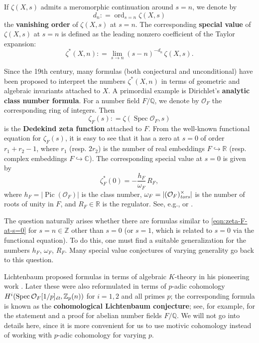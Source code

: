 \documentclass[draft]{article}
\DeclareMathOperator{\ord}{ord}
\DeclareMathOperator{\Pic}{Pic}
\DeclareMathOperator{\Spec}{Spec}
\newcommand{\CC}{\mathbb{C}}
\newcommand{\QQ}{\mathbb{Q}}
\newcommand{\RR}{\mathbb{R}}
\newcommand{\ZZ}{\mathbb{Z}}
\newcommand{\et}{\text{\it \'{e}t}}
\newcommand{\tors}{\text{\it tors}}
\newcommand{\dfn}{\mathrel{\mathop:}=}
\theoremstyle{myplain}
\theoremstyle{mydefinition}
\begin{document}
If $\zeta (X,s)$ admits a meromorphic continuation around $s = n$, we denote by
\begin{equation}
  \label{eqn:vanishing-order}
  d_n \dfn \ord_{s=n} \zeta (X,s)
\end{equation}
the \textbf{vanishing order} of $\zeta (X,s)$ at $s = n$. The corresponding
\textbf{special value} of $\zeta (X,s)$ at $s = n$ is defined as the leading
nonzero coefficient of the Taylor expansion:
$$\zeta^* (X,n) \dfn \lim_{s \to n} (s - n)^{-d_n}\,\zeta (X,s).$$

Since the 19th century, many formulas (both conjectural and unconditional) have
been proposed to interpret the numbers $\zeta^* (X,n)$ in terms of geometric and
algebraic invariants attached to $X$. A primordial example is Dirichlet's
\textbf{analytic class number formula}. For a number field $F/\QQ$, we denote by
$\mathcal{O}_F$ the corresponding ring of integers. Then
$$\zeta_F (s) \dfn \zeta (\Spec \mathcal{O}_F, s)$$
is the \textbf{Dedekind zeta function} attached to $F$. From the well-known
functional equation for $\zeta_F (s)$, it is easy to see that it has a zero at
$s = 0$ of order $r_1 + r_2 - 1$, where $r_1$ (resp.  $2 r_2$) is the number of
real embeddings $F \hookrightarrow \RR$ (resp. complex embeddings
$F \hookrightarrow \CC$). The corresponding special value at $s = 0$ is given by
\begin{equation}
  \label{eqn:zeta-F-at-s=0}
  \zeta^*_F (0) = -\frac{h_F}{\omega_F}\,R_F,
\end{equation}
where $h_F = |\Pic (\mathcal{O}_F)|$ is the class number,
$\omega_F = |(\mathcal{O}_F)^\times_\tors|$ is the number of roots of unity in
$F$, and $R_F \in \RR$ is the regulator. See, e.g.,
\cite[Chapter~5, \S 1]{Borevich-Shafarevich} or \cite[\S VII.5]{Neukirch-1999}.

The question naturally arises whether there are formulas similar to
\eqref{eqn:zeta-F-at-s=0} for $s = n \in \ZZ$ other than $s = 0$ (or $s = 1$,
which is related to $s = 0$ via the functional equation). To do this, one must
find a suitable generalization for the numbers $h_F$, $\omega_F$, $R_F$.  Many
special value conjectures of varying generality go back to this question.

Lichtenbaum proposed formulas in terms of algebraic $K$-theory in his pioneering
work \cite{Lichtenbaum-1973}. Later these were also reformulated in terms of
$p$-adic cohomology $H^i (\Spec \mathcal{O}_F [1/p]_\et, \ZZ_p (n))$ for
$i = 1,2$ and all primes $p$; the corresponding formula is known as the
\textbf{cohomological Lichtenbaum conjecture}; see, for example,
\cite[\S 1.7]{Huber-Kings-2003} for the statement and a proof for abelian number
fields $F/\QQ$. We will not go into details here, since it is more convenient
for us to use motivic cohomology instead of working with $p$-adic cohomology for
varying $p$.
\end{document}
